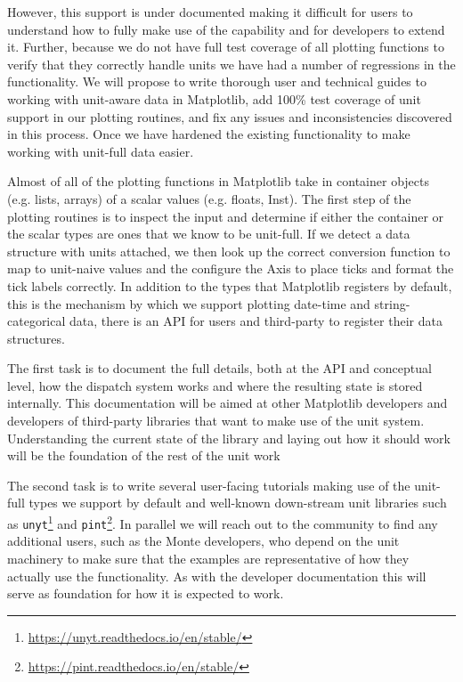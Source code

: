 \documentclass[12pt]{article}
\numberwithin{page}{section}
\begin{document}
However, this support is under documented making it difficult for
users to understand how to fully make use of the capability and for
developers to extend it.  Further, because we do not have full test
coverage of all plotting functions to verify that they correctly
handle units we have had a number of regressions in the functionality.
We will propose to write thorough user and technical guides to working
with unit-aware data in Matplotlib, add 100\% test coverage of unit
support in our plotting routines, and fix any issues and
inconsistencies discovered in this process.  Once we have hardened the
existing functionality to make working with unit-full data easier.

Almost of all of the plotting functions in Matplotlib take in
container objects (e.g. lists, arrays) of a scalar values
(e.g. floats, Inst).  The first step of the plotting routines is to
inspect the input and determine if either the container or the scalar
types are ones that we know to be unit-full.  If we detect a data
structure with units attached, we then look up the correct conversion
function to map to unit-naive values and the configure the Axis to
place ticks and format the tick labels correctly.  In addition to the
types that Matplotlib registers by default, this is the mechanism by
which we support plotting date-time and string-categorical data, there
is an API for users and third-party to register their data structures.

The first task is to document the full details, both at the API and
conceptual level, how the dispatch system works and where the
resulting state is stored internally.  This documentation will be
aimed at other Matplotlib developers and developers of third-party
libraries that want to make use of the unit system.  Understanding the
current state of the library and laying out how it should work will be
the foundation of the rest of the unit work

The second task is to write several user-facing tutorials making use
of the unit-full types we support by default and well-known
down-stream unit libraries such as
\texttt{unyt}\footnote{\url{https://unyt.readthedocs.io/en/stable/}}
and
\texttt{pint}\footnote{\url{https://pint.readthedocs.io/en/stable/}}.
In parallel we will reach out to the community to find any additional
users, such as the Monte developers, who depend on the unit machinery
to make sure that the examples are representative of how they actually
use the functionality.  As with the developer documentation this will
serve as foundation for how it is expected to work.
\end{document}
